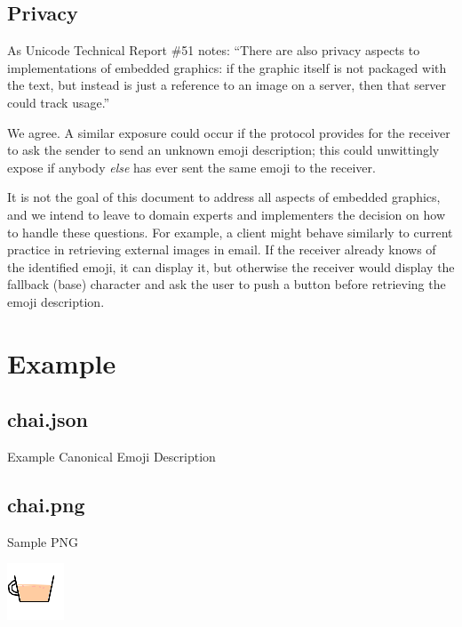 \documentclass[12pt]{article}
\begin{document}
\subsection{Privacy}

As Unicode Technical Report \#51 notes: ``There are also privacy
aspects to implementations of embedded graphics: if the graphic itself
is not packaged with the text, but instead is just a reference to an
image on a server, then that server could track usage.''\autocite[Section 8, ``Longer Term
  Solutions'']{UTR51}

We agree. A similar exposure could occur if the protocol provides
for the receiver to ask the sender to send an unknown emoji description;
this could unwittingly expose if anybody \emph{else} has ever sent the same
emoji to the receiver.

It is not the goal of this document to address all aspects of embedded
graphics, and we intend to leave to domain experts and implementers
the decision on how to handle these questions. For example, a client
might behave similarly to current practice in retrieving external
images in email. If the receiver already knows of the identified
emoji, it can display it, but otherwise the receiver would display the
fallback (base) character and ask the user to push a button before
retrieving the emoji description.

\section{Example}

\subsection{chai.json}

Example Canonical Emoji Description



\subsection{chai.png}

Sample PNG

\includegraphics{chai.png}
\end{document}
